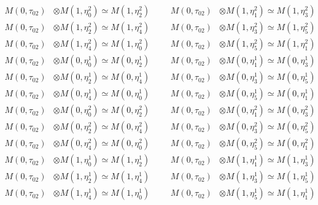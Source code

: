 \begin{align*}
M(0,\tau_{02}) &\otimes M(1,\eta^{2}_{0}) \simeq M(1,\eta^{2}_{2}) &&& M(0,\tau_{02}) &\otimes M(1,\eta^{2}_{1}) \simeq M(1,\eta^{2}_{3})\\
M(0,\tau_{02}) &\otimes M(1,\eta^{2}_{2}) \simeq M(1,\eta^{2}_{4}) &&& M(0,\tau_{02}) &\otimes M(1,\eta^{2}_{3}) \simeq M(1,\eta^{2}_{5})\\
M(0,\tau_{02}) &\otimes M(1,\eta^{2}_{4}) \simeq M(1,\eta^{2}_{0}) &&& M(0,\tau_{02}) &\otimes M(1,\eta^{2}_{5}) \simeq M(1,\eta^{2}_{1})\\
M(0,\tau_{02}) &\otimes M(0,\eta^{1}_{0}) \simeq M(0,\eta^{1}_{2}) &&& M(0,\tau_{02}) &\otimes M(0,\eta^{1}_{1}) \simeq M(0,\eta^{1}_{3})\\
M(0,\tau_{02}) &\otimes M(0,\eta^{1}_{2}) \simeq M(0,\eta^{1}_{4}) &&& M(0,\tau_{02}) &\otimes M(0,\eta^{1}_{3}) \simeq M(0,\eta^{1}_{5})\\
M(0,\tau_{02}) &\otimes M(0,\eta^{1}_{4}) \simeq M(0,\eta^{1}_{0}) &&& M(0,\tau_{02}) &\otimes M(0,\eta^{1}_{5}) \simeq M(0,\eta^{1}_{1})\\
M(0,\tau_{02}) &\otimes M(0,\eta^{2}_{0}) \simeq M(0,\eta^{2}_{2}) &&& M(0,\tau_{02}) &\otimes M(0,\eta^{2}_{1}) \simeq M(0,\eta^{2}_{3})\\
M(0,\tau_{02}) &\otimes M(0,\eta^{2}_{2}) \simeq M(0,\eta^{2}_{4}) &&& M(0,\tau_{02}) &\otimes M(0,\eta^{2}_{3}) \simeq M(0,\eta^{2}_{5})\\
M(0,\tau_{02}) &\otimes M(0,\eta^{2}_{4}) \simeq M(0,\eta^{2}_{0}) &&& M(0,\tau_{02}) &\otimes M(0,\eta^{2}_{5}) \simeq M(0,\eta^{2}_{1})\\
M(0,\tau_{02}) &\otimes M(1,\eta^{1}_{0}) \simeq M(1,\eta^{1}_{2}) &&& M(0,\tau_{02}) &\otimes M(1,\eta^{1}_{1}) \simeq M(1,\eta^{1}_{3})\\
M(0,\tau_{02}) &\otimes M(1,\eta^{1}_{2}) \simeq M(1,\eta^{1}_{4}) &&& M(0,\tau_{02}) &\otimes M(1,\eta^{1}_{3}) \simeq M(1,\eta^{1}_{5})\\
M(0,\tau_{02}) &\otimes M(1,\eta^{1}_{4}) \simeq M(1,\eta^{1}_{0}) &&& M(0,\tau_{02}) &\otimes M(1,\eta^{1}_{5}) \simeq M(1,\eta^{1}_{1})\\
\end{align*}

